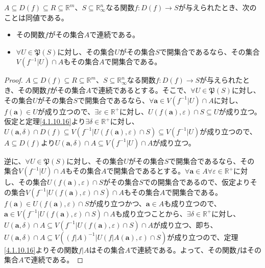 \documentclass[dvipdfmx]{jsarticle}
\begin{document}
\begin{thm}\label{4.1.10.17}
$A \subseteq D(f) \subseteq R \subseteq \mathbb{R}^{m}$、$S \subseteq \mathbb{R}_{\infty}^{n}$なる関数$f:D(f) \rightarrow S$が与えられたとき、次のことは同値である。
\begin{itemize}
\item
  その関数$f$がその集合$A$で連続である。
\item
  $\forall U \in \mathfrak{P}(S)$に対し、その集合$U$がその集合$S$で開集合であるなら、その集合$V\left( f^{- 1}|U \right) \cap A$もその集合$A$で開集合である。
\end{itemize}
\end{thm}
\begin{proof}
$A \subseteq D(f) \subseteq R \subseteq \mathbb{R}^{m}$、$S \subseteq \mathbb{R}_{\infty}^{n}$なる関数$f:D(f) \rightarrow S$が与えられたとき、その関数$f$がその集合$A$で連続であるとする。そこで、$\forall U \in \mathfrak{P}(S)$に対し、その集合$U$がその集合$S$で開集合であるなら、$\forall\mathbf{a} \in V\left( f^{- 1}|U \right) \cap A$に対し、$f\left( \mathbf{a} \right) \in U$が成り立つので、$\exists\varepsilon \in \mathbb{R}^{+}$に対し、$U\left( f\left( \mathbf{a} \right),\varepsilon \right) \cap S \subseteq U$が成り立つ。仮定と定理\ref{4.1.10.16}より$\exists\delta \in \mathbb{R}^{+}$に対し、$U\left( \mathbf{a},\delta \right) \cap D(f) \subseteq V\left( f^{- 1}|U\left( f\left( \mathbf{a} \right),\varepsilon \right) \cap S \right) \subseteq V\left( f^{- 1}|U \right)$が成り立つので、$A \subseteq D(f)$より$U\left( \mathbf{a},\delta \right) \cap A \subseteq V\left( f^{- 1}|U \right) \cap A$が成り立つ。\par
逆に、$\forall U \in \mathfrak{P}(S)$に対し、その集合$U$がその集合$S$で開集合であるなら、その集合$V\left( f^{- 1}|U \right) \cap A$もその集合$A$で開集合であるとする。$\forall\mathbf{a} \in A\forall\varepsilon \in \mathbb{R}^{+}$に対し、その集合$U\left( f\left( \mathbf{a} \right),\varepsilon \right) \cap S$がその集合$S$での開集合であるので、仮定よりその集合$V\left( f^{- 1}|U\left( f\left( \mathbf{a} \right),\varepsilon \right) \cap S \right) \cap A$もその集合$A$で開集合である。$f\left( \mathbf{a} \right) \in U\left( f\left( \mathbf{a} \right),\varepsilon \right) \cap S$が成り立つかつ、$\mathbf{a} \in A$も成り立つので、$\mathbf{a} \in V\left( f^{- 1}|U\left( f\left( \mathbf{a} \right),\varepsilon \right) \cap S \right) \cap A$も成り立つことから、$\exists\delta \in \mathbb{R}^{+}$に対し、$U\left( \mathbf{a},\delta \right) \cap A \subseteq V\left( f^{- 1}|U\left( f\left( \mathbf{a} \right),\varepsilon \right) \cap S \right) \cap A$が成り立つ、即ち、$U\left( \mathbf{a},\delta \right) \cap A \subseteq V\left( \left( f|A \right)^{- 1}|U\left( f|A\left( \mathbf{a} \right),\varepsilon \right) \cap S \right)$が成り立つので、定理\ref{4.1.10.16}よりその関数$f|A$はその集合$A$で連続である。よって、その関数$f$はその集合$A$で連続である。
\end{proof}
\end{document}
